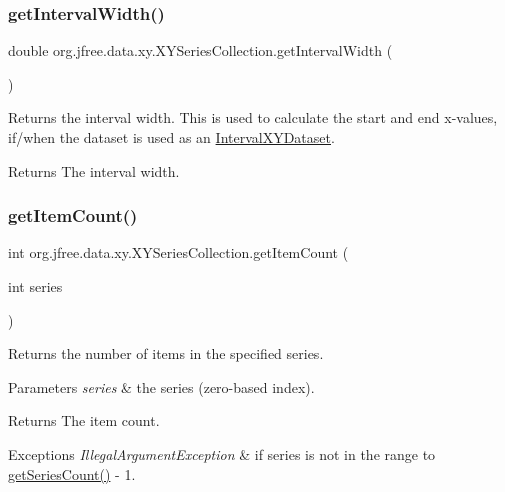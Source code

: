 \subsubsection{\texorpdfstring{get\+Interval\+Width()}{getIntervalWidth()}}
{\footnotesize\ttfamily double org.\+jfree.\+data.\+xy.\+X\+Y\+Series\+Collection.\+get\+Interval\+Width (\begin{DoxyParamCaption}{ }\end{DoxyParamCaption})}

Returns the interval width. This is used to calculate the start and end x-\/values, if/when the dataset is used as an \mbox{\hyperlink{interfaceorg_1_1jfree_1_1data_1_1xy_1_1_interval_x_y_dataset}{Interval\+X\+Y\+Dataset}}.

\begin{DoxyReturn}{Returns}
The interval width. 
\end{DoxyReturn}
\mbox{\label{classorg_1_1jfree_1_1data_1_1xy_1_1_x_y_series_collection_a9f06d873e55cdcefa42ccaa049dc8a1a}} 
\subsubsection{\texorpdfstring{get\+Item\+Count()}{getItemCount()}}
{\footnotesize\ttfamily int org.\+jfree.\+data.\+xy.\+X\+Y\+Series\+Collection.\+get\+Item\+Count (\begin{DoxyParamCaption}\item[{int}]{series }\end{DoxyParamCaption})}

Returns the number of items in the specified series.


\begin{DoxyParams}{Parameters}
{\em series} & the series (zero-\/based index).\\
\hline
\end{DoxyParams}
\begin{DoxyReturn}{Returns}
The item count.
\end{DoxyReturn}

\begin{DoxyExceptions}{Exceptions}
{\em Illegal\+Argument\+Exception} & if {\ttfamily series} is not in the range {} to {\ttfamily \mbox{\hyperlink{classorg_1_1jfree_1_1data_1_1xy_1_1_x_y_series_collection_ab50b1e302d11ddf25ef86dba1b2d4ffe}{get\+Series\+Count()}} -\/ 1}. \\
\hline
\end{DoxyExceptions}


